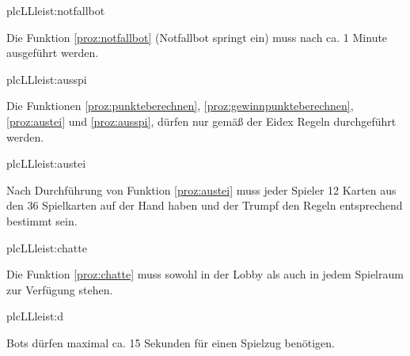 \begin{description}[leftmargin=5em, style=sameline]
	\begin{lhp}{plc}{LL}{leist:notfallbot}
		\item Die Funktion \ref{proz:notfallbot} (Notfallbot springt ein) muss nach ca. 1 Minute ausgeführt werden.
	\end{lhp}

	\begin{lhp}{plc}{LL}{leist:ausspi}
		\item Die Funktionen \ref{proz:punkteberechnen}, \ref{proz:gewinnpunkteberechnen}, \ref{proz:austei} und \ref{proz:ausspi}, dürfen nur gemäß der Eidex Regeln durchgeführt werden.
	\end{lhp}

	\begin{lhp}{plc}{LL}{leist:austei}
		\item Nach Durchführung von Funktion \ref{proz:austei} muss jeder Spieler 12 Karten aus den 36 Spielkarten auf der Hand haben und der Trumpf den Regeln entsprechend bestimmt sein.
	\end{lhp}

	\begin{lhp}{plc}{LL}{leist:chatte}
		\item Die Funktion \ref{proz:chatte} muss sowohl in der Lobby als auch in jedem Spielraum zur Verfügung stehen.
	\end{lhp}
	
	\begin{lhp}{plc}{LL}{leist:d}
		\item Bots dürfen maximal ca. 15 Sekunden für einen Spielzug benötigen.
	\end{lhp}

\end{description}